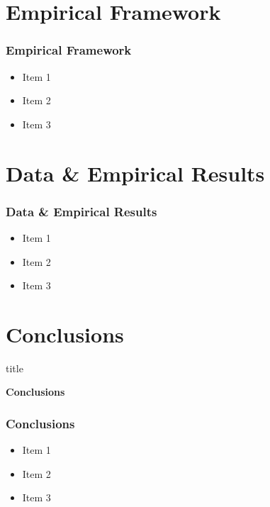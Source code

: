 \documentclass[11pt]{beamer}
\begin{document}
\section{Empirical Framework}
\begin{frame}
	\frametitle{\textbf{Empirical Framework}}
	
		\begin{itemize}
		\item Item 1
		\item Item 2
		\item Item 3
	\end{itemize}
\end{frame}

\section{Data \& Empirical Results}
\begin{frame}
	\frametitle{\textbf{Data \& Empirical Results}}
	
		\begin{itemize}
		\item Item 1
		\item Item 2
		\item Item 3
	\end{itemize}
\end{frame}

\section{Conclusions}
\begin{frame}

	\begin{beamercolorbox}{title}
	\begin{center}
		\bfseries \huge Conclusions
	\end{center}	
\end{beamercolorbox}

\end{frame}

\begin{frame}
	\frametitle{\textbf{Conclusions}}
	
		\begin{itemize}
		\item Item 1
		\item Item 2
		\item Item 3
	\end{itemize}
\end{frame}
\end{document}
